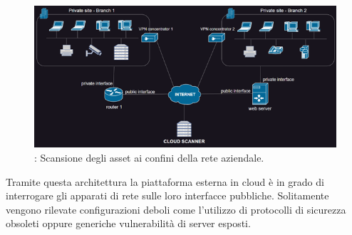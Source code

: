 \documentclass[target=bach,aauheader=]{thud}
\begin{document}

\begin{figure}[h]
\centering
\includegraphics[scale=1.2]{images/scan_esterna.png}
    \caption{: Scansione degli asset ai confini della rete aziendale.}
    \label{fig:scan_esterna}
\end{figure}


Tramite questa architettura la piattaforma esterna in cloud è in grado di interrogare gli apparati di rete sulle loro interfacce pubbliche. Solitamente vengono rilevate configurazioni deboli come l’utilizzo di protocolli di sicurezza obsoleti oppure generiche vulnerabilità di server esposti.
\end{document}
